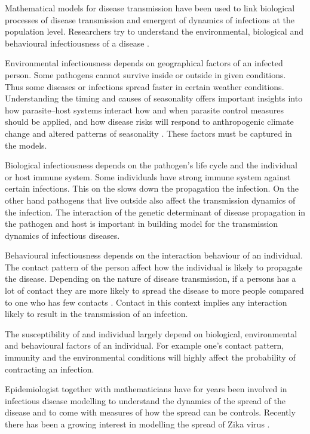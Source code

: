 Mathematical models for disease transmission have been used to link biological processes of disease transmission and emergent of dynamics of infections at the population level.
Researchers try to understand the environmental, biological  and behavioural infectiousness of a disease .
 
  Environmental infectiousness depends on geographical factors of an infected person. Some pathogens cannot survive inside or outside in given conditions. Thus some diseases or infections spread faster in certain weather conditions\citep{grass}. Understanding the timing and causes of seasonality offers important insights into how parasite–host systems interact how and when parasite control measures should be applied, and how disease risks will respond to anthropogenic climate change and altered patterns of seasonality \citep{altizer}. These factors must be captured in the models.
  
  Biological infectiousness depends on the pathogen's life cycle and the individual or host immune system. Some individuals have strong immune system against certain infections. This on the slows down the propagation the infection. On the other hand pathogens that live outside also affect the transmission dynamics of the infection.
The interaction of the genetic determinant of disease propagation in the pathogen and host is important in building model for the transmission dynamics of infectious diseases.
  
Behavioural infectiousness depends on the interaction behaviour of an individual. The contact pattern of the person affect how the individual is likely to propagate   the disease. Depending on the nature of disease transmission, if a persons has a lot of contact they are more likely to spread the disease to more people compared to one who has few contacts \citep{johnson2001sexual}. Contact in this context implies any interaction likely to result in the transmission of an infection.

The susceptibility of and individual largely depend on biological, environmental and behavioural factors of an individual. For example one's contact pattern, immunity and the environmental conditions will highly affect the probability of contracting an infection.

Epidemiologist together with mathematicians have for years been involved in infectious disease modelling to understand the dynamics of the spread of the disease and to come with measures of how the spread can be controls. Recently there has been a growing interest in modelling the spread of Zika virus \citep{ku2016}.

